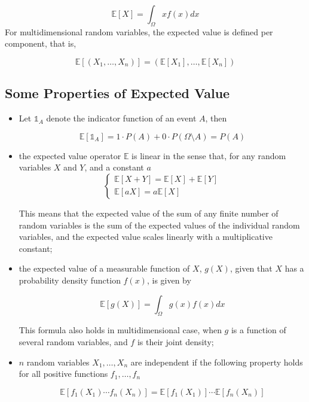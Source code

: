 \begin{equation}
\mathbb{E}[X]=\int_{\Omega}xf(x)dx
\end{equation}
For multidimensional random variables, the expected value is defined per component, that is,

\begin{equation}
\mathbb{E}[(X_{1},\ldots ,X_{n})]=(\mathbb{E} [X_{1}],\ldots ,\mathbb{E}[X_{n}])
\end{equation}

\subsection{Some Properties of Expected Value}\label{some-properties}

\begin{itemize}
\tightlist
\item
Let \(\mathbb{1}_{A}\) denote the indicator function of an event \(A\), then

\begin{equation}
	\mathbb{E}[\mathbb{1}_{A}] = 1\cdot P(A)+0\cdot P(\Omega \setminus A)= P(A)
\end{equation}

\item
the expected value operator \(\mathbb{E}\) is linear in the sense that, for any random variables \(X\) and \(Y\), and a constant \(a\)
\begin{equation}
\begin{cases}
\mathbb{E}[X+Y] = \mathbb{E}[X] + \mathbb{E}[Y] \\
\mathbb{E}[aX] = a\mathbb{E}[X]
\end{cases}
\end{equation}

This means that the expected value of the sum of any finite number of random variables is the sum of the expected values of the individual random variables, and the expected value scales linearly with a multiplicative constant;

\item
the expected value of a measurable function of \(X\), \(g(X)\), given that \(X\) has a probability density function \(f(x)\), is given by 

\begin{equation}
	\mathbb{E}[g(X)] = \int_{\Omega}g(x)f(x) dx
\end{equation}

This formula also holds in multidimensional case, when \(g\) is a function of several random variables, and \(f\) is their joint density;

\item
\(n\) random variables \(X_1 ,\ldots , X_n\) are independent if the following property holds for all positive functions \(f_1 ,\ldots , f_n\)

\begin{equation}
	\mathbb{E}[f_1 (X_1 )\cdots f_n (X_n )] = \mathbb{E}[f_1 ( X_1 )] \cdots \mathbb{E}[f_n (X_n )]
\end{equation}
\end{itemize}


